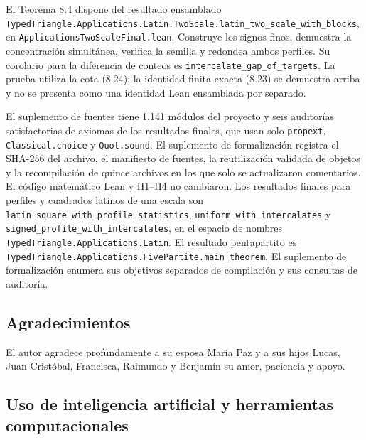 \documentclass[spanish,11pt,a4paper]{article}
\begin{document}
El Teorema 8.4 dispone del resultado ensamblado \texttt{Typed\allowbreak{}Triangle.\allowbreak{}Applications.\allowbreak{}Latin.\allowbreak{}Two\allowbreak{}Scale.\allowbreak{}latin\_\allowbreak{}two\_\allowbreak{}scale\_\allowbreak{}with\_\allowbreak{}blocks}, en \texttt{Applications\allowbreak{}Two\allowbreak{}Scale\allowbreak{}Final.\allowbreak{}lean}. Construye los signos finos, demuestra la concentración simultánea, verifica la semilla y redondea ambos perfiles. Su corolario para la diferencia de conteos es \texttt{intercalate\_\allowbreak{}gap\_\allowbreak{}of\_\allowbreak{}targets}. La prueba utiliza la cota (8.24); la identidad finita exacta (8.23) se demuestra arriba y no se presenta como una identidad Lean ensamblada por separado.

El suplemento de fuentes tiene 1.141 módulos del proyecto y seis auditorías satisfactorias de axiomas de los resultados finales, que usan solo \texttt{propext}, \texttt{Classical.\allowbreak{}choice} y \texttt{Quot.\allowbreak{}sound}. El suplemento de formalización registra el SHA-256 del archivo, el manifiesto de fuentes, la reutilización validada de objetos y la recompilación de quince archivos en los que solo se actualizaron comentarios. El código matemático Lean y H1--H4 no cambiaron. Los resultados finales para perfiles y cuadrados latinos de una escala son \texttt{latin\_\allowbreak{}square\_\allowbreak{}with\_\allowbreak{}profile\_\allowbreak{}statistics}, \texttt{uniform\_\allowbreak{}with\_\allowbreak{}intercalates} y \texttt{signed\_\allowbreak{}profile\_\allowbreak{}with\_\allowbreak{}intercalates}, en el espacio de nombres \texttt{Typed\allowbreak{}Triangle.\allowbreak{}Applications.\allowbreak{}Latin}. El resultado pentapartito es \texttt{Typed\allowbreak{}Triangle.\allowbreak{}Applications.\allowbreak{}Five\allowbreak{}Partite.\allowbreak{}main\_\allowbreak{}theorem}. El suplemento de formalización enumera sus objetivos separados de compilación y sus consultas de auditoría.

\subsection{Agradecimientos}\label{agradecimientos}

El autor agradece profundamente a su esposa María Paz y a sus hijos Lucas, Juan Cristóbal, Francisca, Raimundo y Benjamín su amor, paciencia y apoyo.

\subsection{Uso de inteligencia artificial y herramientas computacionales}\label{uso-de-inteligencia-artificial-y-herramientas-computacionales}
\end{document}
